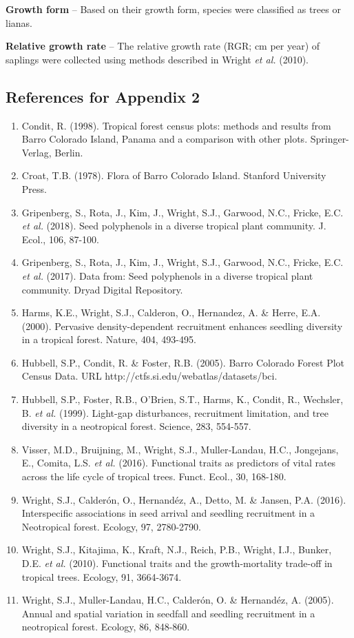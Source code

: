 \documentclass[11pt]{article}
\begin{document}
\textbf{Growth form} – Based on their growth form, species were classified as trees or lianas.

\textbf{Relative growth rate} – The relative growth rate (RGR; cm per year) of saplings were collected using methods described in Wright \emph{et al. }(2010). 


\subsection*{References for Appendix 2}

\begin{enumerate}

\item Condit, R. (1998). Tropical forest census plots: methods and results from Barro Colorado Island, Panama and a comparison with other plots. Springer-Verlag, Berlin.
\item Croat, T.B. (1978). Flora of Barro Colorado Island. Stanford University Press.
\item Gripenberg, S., Rota, J., Kim, J., Wright, S.J., Garwood, N.C., Fricke, E.C. \emph{et al. }(2018). Seed polyphenols in a diverse tropical plant community. J. Ecol., 106, 87-100.
\item Gripenberg, S., Rota, J., Kim, J., Wright, S.J., Garwood, N.C., Fricke, E.C. \emph{et al. }(2017). Data from: Seed polyphenols in a diverse tropical plant community. Dryad Digital Repository.
\item Harms, K.E., Wright, S.J., Calderon, O., Hernandez, A. \& Herre, E.A. (2000). Pervasive density-dependent recruitment enhances seedling diversity in a tropical forest. Nature, 404, 493-495.
\item Hubbell, S.P., Condit, R. \& Foster, R.B. (2005). Barro Colorado Forest Plot Census Data. URL http://ctfs.si.edu/webatlas/datasets/bci.
\item Hubbell, S.P., Foster, R.B., O'Brien, S.T., Harms, K., Condit, R., Wechsler, B. \emph{et al. }(1999). Light-gap disturbances, recruitment limitation, and tree diversity in a neotropical forest. Science, 283, 554-557.
\item Visser, M.D., Bruijning, M., Wright, S.J., Muller‐Landau, H.C., Jongejans, E., Comita, L.S. \emph{et al. }(2016). Functional traits as predictors of vital rates across the life cycle of tropical trees. Funct. Ecol., 30, 168-180.
\item Wright, S.J., Calderón, O., Hernandéz, A., Detto, M. \& Jansen, P.A. (2016). Interspecific associations in seed arrival and seedling recruitment in a Neotropical forest. Ecology, 97, 2780-2790.
\item Wright, S.J., Kitajima, K., Kraft, N.J., Reich, P.B., Wright, I.J., Bunker, D.E. \emph{et al. }(2010). Functional traits and the growth-mortality trade-off in tropical trees. Ecology, 91, 3664-3674.
\item Wright, S.J., Muller-Landau, H.C., Calderón, O. \& Hernandéz, A. (2005). Annual and spatial variation in seedfall and seedling recruitment in a neotropical forest. Ecology, 86, 848-860.
\end{enumerate}
\end{document}
